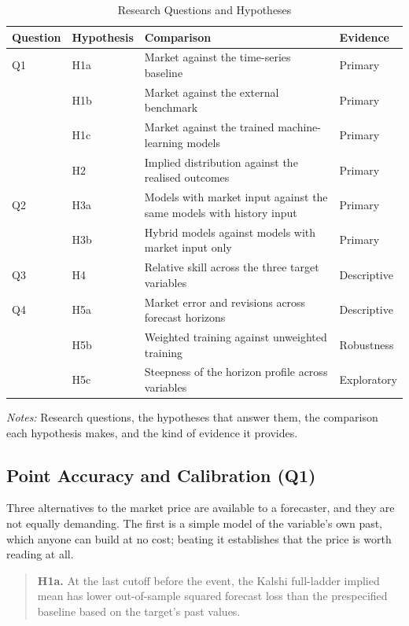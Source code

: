 \documentclass[12pt,a4paper]{report}
\newcommand{\tablenote}[1]{%
  \par\vspace{0.4em}%
  \begin{minipage}{0.9\textwidth}%
  \footnotesize\raggedright\emph{Notes:} #1%
  \end{minipage}%
}
\begin{document}
\begin{table}[htbp]
\centering
\caption{Research Questions and Hypotheses}
\label{tab:rq-hypotheses}
\small
\begin{tabular}{llp{5.1cm}p{2.4cm}}
\hline
Question & Hypothesis & Comparison & Evidence \\
\hline
Q1 & H1a & Market against the time-series baseline & Primary \\
   & H1b & Market against the external benchmark & Primary \\
   & H1c & Market against the trained machine-learning models & Primary \\
   & H2  & Implied distribution against the realised outcomes & Primary \\
Q2 & H3a & Models with market input against the same models with history input & Primary \\
   & H3b & Hybrid models against models with market input only & Primary \\
Q3 & H4  & Relative skill across the three target variables & Descriptive \\
Q4 & H5a & Market error and revisions across forecast horizons & Descriptive \\
   & H5b & Weighted training against unweighted training & Robustness \\
   & H5c & Steepness of the horizon profile across variables & Exploratory \\
\hline
\end{tabular}
\tablenote{Research questions, the hypotheses that answer them, the comparison
each hypothesis makes, and the kind of evidence it provides.}
\end{table}

\subsection{Point Accuracy and Calibration (Q1)}

Three alternatives to the market price are available to a forecaster, and they
are not equally demanding. The first is a simple model of the variable's own
past, which anyone can build at no cost; beating it establishes that the price
is worth reading at all.

\begin{quote}
\textbf{H1a.} At the last cutoff before the event, the Kalshi full-ladder
implied mean has lower out-of-sample squared forecast loss than the
prespecified baseline based on the target’s past values.
\end{quote}
\end{document}
